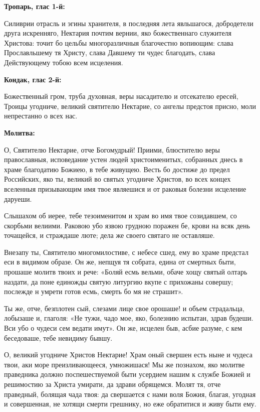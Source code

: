 \bfseries Тропарь, глас 1-й:\normalfont{}\nopagebreak


Силиврии отрасль и эгины хранителя, в последняя лета явльшагося, добродетели друга искренняго, Нектария почтим вернии, яко божественнаго служителя Христова: точит бо цельбы многоразличныя благочестно вопиющим: слава Прославльшему тя Христу, слава Давшему ти чудес благодать, слава Действующему тобою всем исцеления.


\medskip


\bfseries Кондак, глас 2-й:\normalfont{}\nopagebreak


Божественный гром, труба духовная, веры насадителю и отсекателю ересей, Троицы угодниче, великий святителю Нектарие, со ангелы предстоя присно, моли непрестанно о всех нас.


\medskip


\bfseries Молитва:\normalfont{}\nopagebreak


О, Святителю Нектарие, отче Богомудрый! Приими, блюстителю веры православныя, исповедание устен людей христоименитых, собранных днесь в храме благодатию Божиею, в тебе живущею. Весть бо достиже до предел Российских, яко ты, великий во святых угодниче Христов, во всех концех вселенныя призывающим имя твое являешися и от раковыя болезни исцеление даруеши.


Слышахом об иерее, тебе тезоименитом и храм во имя твое созидавшем, со скорбьми велиими. Раковою убо язвою грудною поражен бе, крови на всяк день точащейся, и страждаше люте; дела же своего святаго не оставляше.


Внезапу ты, Святителю многомилостиве, с небесе сшед, ему во храме предстал еси в видимом образе. Он же, непщуя тя собрата, едина от смертных быти, прошаше молитв твоих и рече: «Боляй есмь вельми, обаче хощу святый олтарь наздати, да поне единожды святую литургию вкупе с прихожаны совершу; послежде н умрети готов есмь, смерть бо мя не страшит».


Ты же, отче, безплотен сый, слезами лице свое орошаше! и объем страдальца, лобызаше и, глаголя: «Не тужи, чадо мое, яко, болезнию испытан, здрав будеши. Вси убо о чудеси сем ведати имут». Он же, исцелен быв, асбие разуме, с кем беседоваше, тебе невидиму бывшу.

О, великий угодниче Христов Нектарие! Храм оный свершен есть ныне и чудеса твои, аки море преизливающееся, умножишася! Мы же познахом, яко молитве праведника должно поспешествуемой быти усердием нашим к службе Божией и решимостию за Христа умирати, да здрави обрящемся. Молят тя, отче праведный, болящая чада твоя: да свершается с нами воля Божия, благая, угодная и совершенная, не хотящи смерти грешнику, но еже обратитися и живу быти ему.


